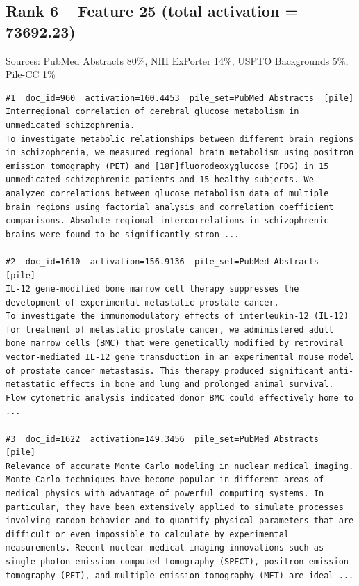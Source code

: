 \subsection*{Rank 6 -- Feature 25 (total activation = 73692.23)}

Sources: PubMed Abstracts 80\%, NIH ExPorter 14\%, USPTO Backgrounds 5\%, Pile-CC 1\%

\begin{verbatim}
#1  doc_id=960  activation=160.4453  pile_set=PubMed Abstracts  [pile]
Interregional correlation of cerebral glucose metabolism in unmedicated schizophrenia.
To investigate metabolic relationships between different brain regions in schizophrenia, we measured regional brain metabolism using positron emission tomography (PET) and [18F]fluorodeoxyglucose (FDG) in 15 unmedicated schizophrenic patients and 15 healthy subjects. We analyzed correlations between glucose metabolism data of multiple brain regions using factorial analysis and correlation coefficient comparisons. Absolute regional intercorrelations in schizophrenic brains were found to be significantly stron ...

#2  doc_id=1610  activation=156.9136  pile_set=PubMed Abstracts  [pile]
IL-12 gene-modified bone marrow cell therapy suppresses the development of experimental metastatic prostate cancer.
To investigate the immunomodulatory effects of interleukin-12 (IL-12) for treatment of metastatic prostate cancer, we administered adult bone marrow cells (BMC) that were genetically modified by retroviral vector-mediated IL-12 gene transduction in an experimental mouse model of prostate cancer metastasis. This therapy produced significant anti-metastatic effects in bone and lung and prolonged animal survival. Flow cytometric analysis indicated donor BMC could effectively home to ...

#3  doc_id=1622  activation=149.3456  pile_set=PubMed Abstracts  [pile]
Relevance of accurate Monte Carlo modeling in nuclear medical imaging.
Monte Carlo techniques have become popular in different areas of medical physics with advantage of powerful computing systems. In particular, they have been extensively applied to simulate processes involving random behavior and to quantify physical parameters that are difficult or even impossible to calculate by experimental measurements. Recent nuclear medical imaging innovations such as single-photon emission computed tomography (SPECT), positron emission tomography (PET), and multiple emission tomography (MET) are ideal ...


\end{verbatim}
